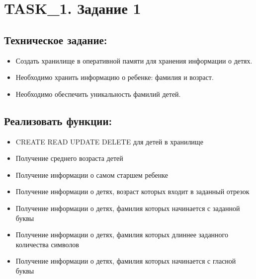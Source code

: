 \chapter{TASK\_1. Задание 1}

\section{Техническое задание:}

\begin{itemize}
	\item Создать хранилище в оперативной памяти для хранения информации о детях.
	\item Необходимо хранить информацию о ребенке: фамилия и возраст.
	\item Необходимо обеспечить уникальность фамилий детей.
\end{itemize}

\section{Реализовать функции:}

\begin{itemize}
	\item CREATE READ UPDATE DELETE для детей в хранилище
	\item Получение среднего возраста детей
	\item Получение информации о самом старшем ребенке
	\item Получение информации о детях, возраст которых входит в заданный отрезок
	\item Получение информации о детях, фамилия которых начинается с заданной буквы
	\item Получение информации о детях, фамилия которых длиннее заданного количества символов
	\item Получение информации о детях, фамилия которых начинается с гласной буквы
\end{itemize}

